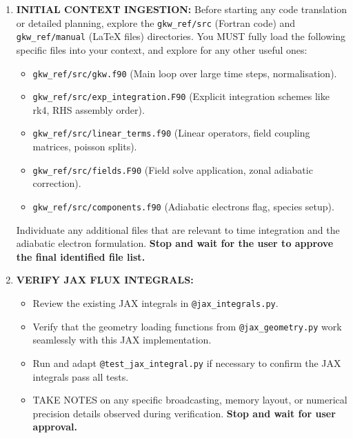 \documentclass{article}
\theoremstyle{plain}
\theoremstyle{definition}
\theoremstyle{remark}
\begin{document}
\begin{promptbox}[]
\begin{enumerate}[leftmargin=*, noitemsep, topsep=0pt]
    \item \textbf{INITIAL CONTEXT INGESTION:} Before starting any code translation or detailed planning, explore the \texttt{gkw\_ref/src} (Fortran code) and \texttt{gkw\_ref/manual} (LaTeX files) directories. You MUST fully load the following specific files into your context, and explore for any other useful ones:
        \begin{itemize}[leftmargin=*, noitemsep, topsep=0pt]
            \item \texttt{gkw\_ref/src/gkw.f90} (Main loop over large time steps, normalisation).
            \item \texttt{gkw\_ref/src/exp\_integration.F90} (Explicit integration schemes like rk4, RHS assembly order).
            \item \texttt{gkw\_ref/src/linear\_terms.f90} (Linear operators, field coupling matrices, poisson splits).
            \item \texttt{gkw\_ref/src/fields.F90} (Field solve application, zonal adiabatic correction).
            \item \texttt{gkw\_ref/src/components.f90} (Adiabatic electrons flag, species setup).
        \end{itemize}
        Individuate any additional files that are relevant to time integration and the adiabatic electron formulation. \textbf{Stop and wait for the user to approve the final identified file list.}
    
    \item \textbf{VERIFY JAX FLUX INTEGRALS:} 
    \begin{itemize}[leftmargin=*, noitemsep, topsep=0pt]
        \item Review the existing JAX integrals in \texttt{@jax\_integrals.py}.
        \item Verify that the geometry loading functions from \texttt{@jax\_geometry.py} work seamlessly with this JAX implementation.
        \item Run and adapt \texttt{@test\_jax\_integral.py} if necessary to confirm the JAX integrals pass all tests.
        \item TAKE NOTES on any specific broadcasting, memory layout, or numerical precision details observed during verification. \textbf{Stop and wait for user approval.}
    \end{itemize}
    

\end{enumerate}
\end{promptbox}
\end{document}
